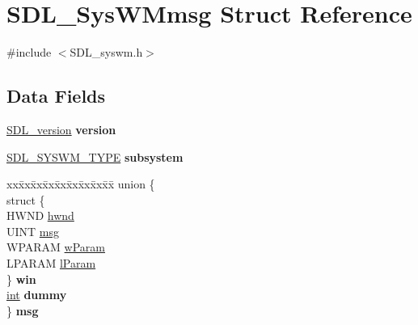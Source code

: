 \hypertarget{struct_s_d_l___sys_w_mmsg}{}\section{S\+D\+L\+\_\+\+Sys\+W\+Mmsg Struct Reference}
\label{struct_s_d_l___sys_w_mmsg}


{\ttfamily \#include $<$S\+D\+L\+\_\+syswm.\+h$>$}

\subsection*{Data Fields}
\begin{DoxyCompactItemize}
\item 
\hyperlink{struct_s_d_l__version}{S\+D\+L\+\_\+version} {\bfseries version}\hypertarget{struct_s_d_l___sys_w_mmsg_a4aaa8edb964920f77d969c6c08537476}{}\label{struct_s_d_l___sys_w_mmsg_a4aaa8edb964920f77d969c6c08537476}

\item 
\hyperlink{_s_d_l__syswm_8h_a064c26598287280fff2a00d6758ac4f7}{S\+D\+L\+\_\+\+S\+Y\+S\+W\+M\+\_\+\+T\+Y\+PE} {\bfseries subsystem}\hypertarget{struct_s_d_l___sys_w_mmsg_a5d89c66a940596db3ebdc1664d634c38}{}\label{struct_s_d_l___sys_w_mmsg_a5d89c66a940596db3ebdc1664d634c38}

\item 
\begin{tabbing}
xx\=xx\=xx\=xx\=xx\=xx\=xx\=xx\=xx\=\kill
union \{\\
\>struct \{\\
\>\>HWND \hyperlink{struct_s_d_l___sys_w_mmsg_aa72255e7356d612ad72bb45def01fcbb}{hwnd}\\
\>\>UINT \hyperlink{struct_s_d_l___sys_w_mmsg_a43204af3a61671f6c669bf2539b7475f}{msg}\\
\>\>WPARAM \hyperlink{struct_s_d_l___sys_w_mmsg_a2c28a497a9b541541d5b8713a639a31b}{wParam}\\
\>\>LPARAM \hyperlink{struct_s_d_l___sys_w_mmsg_a6502a620e85496eb7a57b0097af61a83}{lParam}\\
\>\} {\bfseries win}\\
\>\hyperlink{_s_d_l__thread_8h_a6a64f9be4433e4de6e2f2f548cf3c08e}{int} {\bfseries dummy}\\
\} {\bfseries msg}\hypertarget{struct_s_d_l___sys_w_mmsg_a50c5fbae468a6cbcd691296f26adeb60}{}\label{struct_s_d_l___sys_w_mmsg_a50c5fbae468a6cbcd691296f26adeb60}
\\

\end{tabbing}\end{DoxyCompactItemize}


